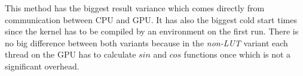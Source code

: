 This method has the biggest result variance which comes directly from communication between CPU and GPU. It has also the biggest cold start times since the kernel has to be compiled by an environment on the first run. There is no big difference between both variants because in the \textit{non-LUT} variant each thread on the GPU has to calculate $sin$ and $cos$ functions once which is not a significant overhead.

